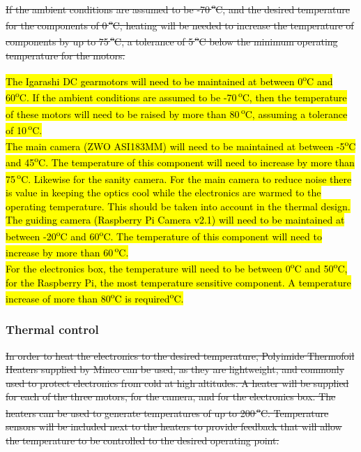 \st{If the ambient conditions are assumed to be -70\,\textsuperscript{o}C, and the desired temperature for the components of 0\,\textsuperscript{o}C, heating will be needed to increase the temperature of components by up to  75\,\textsuperscript{o}C, a tolerance of 5\,\textsuperscript{o}C below the minimum operating temperature for the motors.\\} 

\hl{The Igarashi DC gearmotors will need to be maintained at between 0\textsuperscript{o}C and 60\textsuperscript{o}C. If the ambient conditions are assumed to be -70\,\textsuperscript{o}C, then the temperature of these motors will need to be raised by more than 80\,\textsuperscript{o}C, assuming a tolerance of 10\,\textsuperscript{o}C.\\

The main camera (ZWO ASI183MM) will need to be maintained at between -5\textsuperscript{o}C and 45\textsuperscript{o}C. The temperature of this component will need to increase by more than 75\,\textsuperscript{o}C. Likewise for the sanity camera. For the main camera to reduce noise there is value in keeping the optics cool while the electronics are warmed to the operating temperature. This should be taken into account in the thermal design.\\

The guiding camera (Raspberry Pi Camera v2.1) will need to be maintained at between -20\textsuperscript{o}C and 60\textsuperscript{o}C. The temperature of this component will need to increase by more than 60\,\textsuperscript{o}C.\\

For the electronics box, the temperature will need to be between 0\textsuperscript{o}C and 50\textsuperscript{o}C, for the Raspberry Pi, the most temperature sensitive component. A temperature increase of more than 80\textsuperscript{o}C is required\textsuperscript{o}C.\\}

\subsubsection{Thermal control}
\st{In order to heat the electronics to the desired temperature, Polyimide Thermofoil Heaters supplied by Minco can be used, as they are lightweight, and commonly used to protect electronics from cold at high altitudes. A heater will be supplied for each of the three motors, for the camera, and for the electronics box. The heaters can be used to generate temperatures of up to 200\,\textsuperscript{o}C. Temperature sensors will be included next to the heaters to provide feedback that will allow the temperature to be controlled to the desired operating point.} \\

